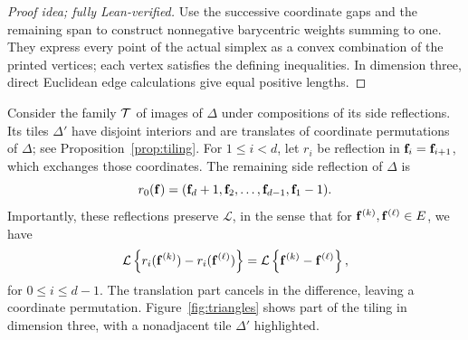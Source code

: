 \documentclass[11pt,letterpaper]{article}
\begin{document}
\begin{proof}[Proof idea; fully Lean-verified]
Use the successive coordinate gaps and the remaining span to construct nonnegative barycentric weights summing to one. They express every point of the actual simplex as a convex combination of the printed vertices; each vertex satisfies the defining inequalities. In dimension three, direct Euclidean edge calculations give equal positive lengths.
\end{proof}
Consider the family $\mathcal T$ of images of $\Delta$ under compositions of its side reflections. Its tiles $\Delta'$ have disjoint interiors and are translates of coordinate permutations of $\Delta$; see Proposition~\ref{prop:tiling}.
For $1\le i<d$, let $r_i$ be reflection in $\mathbf f_i=\mathbf f_{i+1}$, which exchanges those coordinates. The remaining side reflection of $\Delta$ is
\[
      r_0(\mathbf f)=(\mathbf f_d+1,\mathbf f_2,\ldots,\mathbf f_{d-1},\mathbf f_1-1).
\]
Importantly, these reflections preserve $\mathcal L$, in the sense that for $\mathbf f^{(k)},\mathbf f^{(\ell)}\in E$, we have
\[\mathcal L\left\{r_{i}(\mathbf f^{(k)})-r_{i}(\mathbf f^{(\ell)})\right\}=\mathcal L\left\{\mathbf f^{(k)}-\mathbf f^{(\ell)}\right\},\]
for $0\leq i\leq d-1$. The translation part cancels in the difference, leaving a coordinate permutation. Figure~\ref{fig:triangles} shows part of the tiling in dimension three, with a nonadjacent tile $\Delta'$ highlighted.
\end{document}
